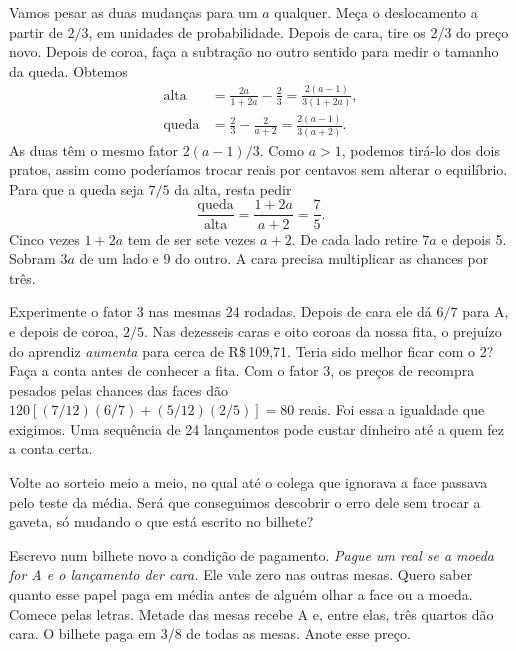 Vamos pesar as duas mudanças para um $a$ qualquer. Meça o deslocamento a partir de $2/3$, em unidades de probabilidade. Depois de cara, tire os $2/3$ do preço novo. Depois de coroa, faça a subtração no outro sentido para medir o tamanho da queda. Obtemos
\[
 \begin{aligned}
 \text{alta}&=\frac{2a}{1+2a}-\frac23=\frac{2(a-1)}{3(1+2a)},\\[4pt]
 \text{queda}&=\frac23-\frac{2}{a+2}=\frac{2(a-1)}{3(a+2)}.
 \end{aligned}
\]
As duas têm o mesmo fator $2(a-1)/3$. Como $a>1$, podemos tirá-lo dos dois pratos, assim como poderíamos trocar reais por centavos sem alterar o equilíbrio. Para que a queda seja $7/5$ da alta, resta pedir
\[
 \frac{\text{queda}}{\text{alta}}=\frac{1+2a}{a+2}=\frac75.
\]
Cinco vezes $1+2a$ tem de ser sete vezes $a+2$. De cada lado retire $7a$ e depois 5. Sobram $3a$ de um lado e 9 do outro. A cara precisa multiplicar as chances por três.

Experimente o fator 3 nas mesmas 24 rodadas. Depois de cara ele dá $6/7$ para A, e depois de coroa, $2/5$. Nas dezesseis caras e oito coroas da nossa fita, o prejuízo do aprendiz \emph{aumenta} para cerca de R\$\,109,71. Teria sido melhor ficar com o 2? Faça a conta antes de conhecer a fita. Com o fator 3, os preços de recompra pesados pelas chances das faces dão $120[(7/12)(6/7)+(5/12)(2/5)]=80$ reais. Foi essa a igualdade que exigimos. Uma sequência de 24 lançamentos pode custar dinheiro até a quem fez a conta certa.

Volte ao sorteio meio a meio, no qual até o colega que ignorava a face passava pelo teste da média. Será que conseguimos descobrir o erro dele sem trocar a gaveta, só mudando o que está escrito no bilhete?

Escrevo num bilhete novo a condição de pagamento. \emph{Pague um real se a moeda for A e o lançamento der cara.} Ele vale zero nas outras mesas. Quero saber quanto esse papel paga em média antes de alguém olhar a face ou a moeda. Comece pelas letras. Metade das mesas recebe A e, entre elas, três quartos dão cara. O bilhete paga em $3/8$ de todas as mesas. Anote esse preço.

